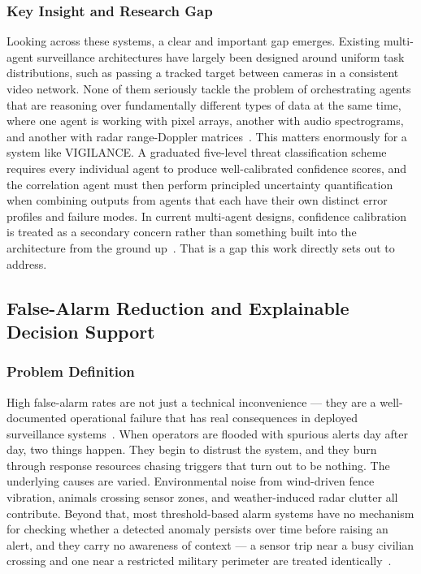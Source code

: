 \subsubsection{Key Insight and Research Gap}
Looking across these systems, a clear and important gap emerges. Existing multi-agent surveillance architectures have largely been designed around uniform task distributions, such as passing a tracked target between cameras in a consistent video network. None of them seriously tackle the problem of orchestrating agents that are reasoning over fundamentally different types of data at the same time, where one agent is working with pixel arrays, another with audio spectrograms, and another with radar range-Doppler matrices~\cite{hassan2025multiagent, agenticcyber2025}. This matters enormously for a system like VIGILANCE. A graduated five-level threat classification scheme requires every individual agent to produce well-calibrated confidence scores, and the correlation agent must then perform principled uncertainty quantification when combining outputs from agents that each have their own distinct error profiles and failure modes. In current multi-agent designs, confidence calibration is treated as a secondary concern rather than something built into the architecture from the ground up~\cite{cset2025ai}. That is a gap this work directly sets out to address.


\subsection{False-Alarm Reduction and Explainable Decision Support}
\label{sec:falsealarm}

\subsubsection{Problem Definition}
High false-alarm rates are not just a technical inconvenience --- they are a well-documented operational failure that has real consequences in deployed surveillance systems~\cite{deepsurvey2023anomaly}. When operators are flooded with spurious alerts day after day, two things happen. They begin to distrust the system, and they burn through response resources chasing triggers that turn out to be nothing. The underlying causes are varied. Environmental noise from wind-driven fence vibration, animals crossing sensor zones, and weather-induced radar clutter all contribute. Beyond that, most threshold-based alarm systems have no mechanism for checking whether a detected anomaly persists over time before raising an alert, and they carry no awareness of context --- a sensor trip near a busy civilian crossing and one near a restricted military perimeter are treated identically~\cite{cctv2024anomaly}.

